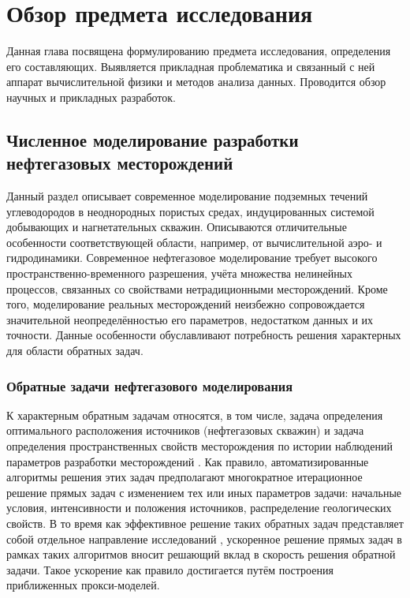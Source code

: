 \chapter{Обзор предмета исследования}\label{ch:ch1}


Данная глава посвящена формулированию предмета исследования, определения его составляющих.
Выявляется прикладная проблематика и связанный с ней аппарат вычислительной физики и методов анализа данных. Проводится обзор научных и прикладных разработок.

\section{Численное моделирование разработки нефтегазовых месторождений}

Данный раздел описывает современное моделирование подземных течений углеводородов в неоднородных пористых средах, индуцированных системой добывающих и нагнетательных скважин.
Описываются отличительные особенности соответствующей области, например, от вычислительной аэро- и гидродинамики.
Современное нефтегазовое моделирование требует высокого пространственно-временного разрешения, учёта множества нелинейных процессов, связанных со свойствами нетрадиционными месторождений.
Кроме того, моделирование реальных месторождений неизбежно сопровождается значительной неопределённостью его параметров, недостатком данных и их точности.
Данные особенности обуславливают потребность решения характерных для области обратных задач.

\subsection{Обратные задачи нефтегазового моделирования}
К характерным обратным задачам относятся, в том числе, задача определения оптимального расположения источников (нефтегазовых скважин) \todo{\cite{}} и задача определения пространственных свойств месторождения по истории наблюдений параметров разработки месторождений \todo{\cite{}}.
Как правило, автоматизированные алгоритмы решения этих задач предполагают многократное итерационное решение прямых задач с изменением тех или иных параметров задачи: начальные условия, интенсивности и положения источников, распределение геологических свойств. В то время как эффективное решение таких обратных задач представляет собой отдельное направление исследований , ускоренное решение прямых задач в рамках таких алгоритмов вносит решающий вклад в скорость решения обратной задачи. Такое ускорение как правило достигается путём построения приближенных прокси-моделей.

